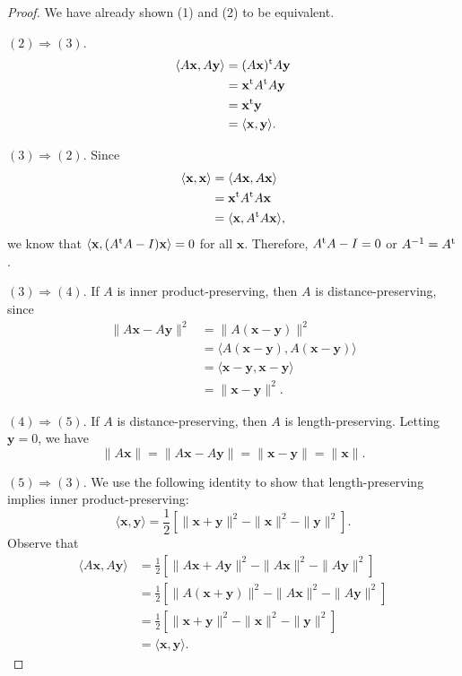  
\begin{proof}
We have already shown (1) and (2) to be equivalent.
 
$(2) \Rightarrow (3)$.
\begin{align*}
\langle A{\mathbf x}, A{\mathbf y} \rangle
& =
(A {\mathbf x})^{\rm t} A {\mathbf y} \\
& =
{\mathbf x}^{\rm t} A^{\rm t} A {\mathbf y} \\
& =
{\mathbf x}^{\rm t} {\mathbf y} \\
& =
\langle {\mathbf x}, {\mathbf y} \rangle.
\end{align*}
 
$(3) \Rightarrow (2)$.
Since
\begin{align*}
\langle {\mathbf x}, {\mathbf x} \rangle
& =
\langle A{\mathbf x}, A{\mathbf x} \rangle \\
& =
{\mathbf x}^{\rm t} A^{\rm t} A {\mathbf x} \\
& =
\langle {\mathbf x}, A^{\rm t} A{\mathbf x} \rangle,
\end{align*}
we know that $\langle {\mathbf x}, (A^{\rm t} A - I){\mathbf x} \rangle =
0$ for all ${\mathbf x}$.  Therefore, $A^{\rm t} A -I = 0$ or $A^{-1} =
A^{\rm t}$.

 
 
$(3) \Rightarrow (4)$.
If $A$ is inner product-preserving, then $A$ is distance-preserving,
since 
\begin{align*}
\| A{\mathbf x} - A{\mathbf y} \|^2
& =
\| A({\mathbf x} - {\mathbf y}) \|^2 \\
& =
\langle
A({\mathbf x} - {\mathbf y}), A({\mathbf x} - {\mathbf y})
\rangle \\
& =
\langle
{\mathbf x} - {\mathbf y}, {\mathbf x} - {\mathbf y}
\rangle \\
& =
\| {\mathbf x} - {\mathbf y} \|^2.
\end{align*}
 
 
$(4) \Rightarrow (5)$.
If $A$ is distance-preserving, then $A$ is length-preserving. Letting
${\mathbf y} = 0$, we have
\[
\| A{\mathbf x}\|
= \| A{\mathbf x}- A{\mathbf y} \|
= \| {\mathbf x}- {\mathbf y} \|
= \| {\mathbf x} \|.
\]
 
 
$(5) \Rightarrow (3)$.
We use the following identity to show that length-preserving implies
inner product-preserving: 
\[
\langle {\mathbf x}, {\mathbf y} \rangle
=
\frac{1}{2}
\left[
\|{\mathbf x} +{\mathbf y}\|^2 -
 \|{\mathbf x}\|^2 - \|{\mathbf y}\|^2
\right].
\]
Observe that
\begin{align*}
\langle A {\mathbf x}, A {\mathbf y} \rangle
& =
\frac{1}{2}
\left[
\|A {\mathbf x} + A {\mathbf y} \|^2
- \|A {\mathbf x} \|^2 -  \|A {\mathbf y} \|^2
\right] \\
& =
\frac{1}{2}
\left[
\|A ( {\mathbf x} + {\mathbf y} ) \|^2
- \|A {\mathbf x} \|^2 -  \|A {\mathbf y} \|^2
\right] \\
& =
\frac{1}{2}
\left[
\|{\mathbf x} + {\mathbf y}\|^2
- \|{\mathbf x}\|^2 - \|{\mathbf y}\|^2
\right] \\
& =
\langle {\mathbf x}, {\mathbf y} \rangle.
\end{align*}
\end{proof}
